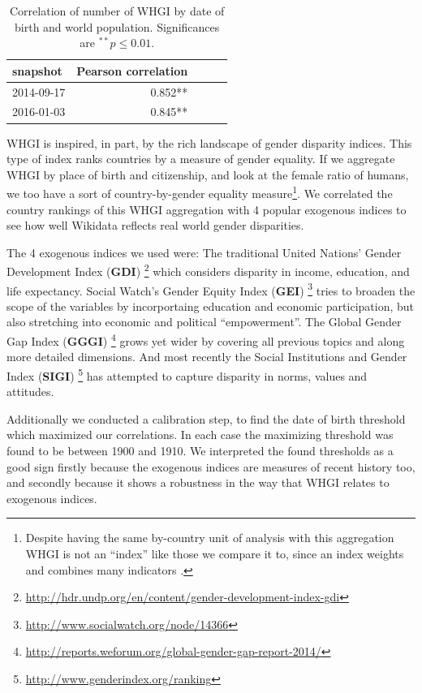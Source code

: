 \documentclass{sig-alternate-05-2015}
\begin{document}
\begin{table}
\caption{Correlation of number of WHGI by date of birth and world population. Significances are $ ^{**}p\leq 0.01$.}
\label{table:worldpop}
\begin{tabular}{lrrrr}
\toprule
snapshot &  Pearson correlation \\
\midrule
2014-09-17 & 0.852**  \\
2016-01-03 & 0.845**  \\
\bottomrule
\end{tabular}
\end{table}


WHGI is inspired, in part, by the rich landscape of gender disparity indices. This type of index ranks countries by a measure of gender equality. If we aggregate WHGI by place of birth and citizenship, and look at the female ratio of humans, we too have a sort of country-by-gender equality measure\footnote{Despite having the same by-country unit of analysis with this aggregation WHGI is not an ``index'' like those we compare it to, since an index weights and combines many indicators \cite{rossi_handbook_1980}. }.  We correlated the country rankings of this WHGI aggregation with 4 popular exogenous indices to see how well Wikidata reflects real world gender disparities.

The 4 exogenous indices we used were: The traditional United Nations' Gender Development Index (\textbf{GDI})  \footnote{\url{http://hdr.undp.org/en/content/gender-development-index-gdi}} which considers disparity in income, education, and life expectancy. Social Watch's Gender Equity Index (\textbf{GEI}) \footnote{\url{http://www.socialwatch.org/node/14366}} tries to broaden the scope of the variables by incorportaing education and economic participation, but also stretching into economic and political ``empowerment''. The Global Gender Gap Index (\textbf{GGGI}) \footnote{\url{http://reports.weforum.org/global-gender-gap-report-2014/}} grows yet wider by covering all previous topics and along more detailed dimensions. And most recently  the Social Institutions and Gender Index (\textbf{SIGI}) \footnote{\url{http://www.genderindex.org/ranking}} has attempted to capture disparity in norms, values and attitudes.

Additionally we conducted a calibration step, to find the date of birth threshold which maximized our correlations. In each case the maximizing threshold was found to be between 1900 and 1910. We interpreted the found thresholds as a good sign firstly because the exogenous indices are measures of recent history too, and secondly because it shows a robustness in the way that WHGI relates to exogenous indices.
\end{document}
